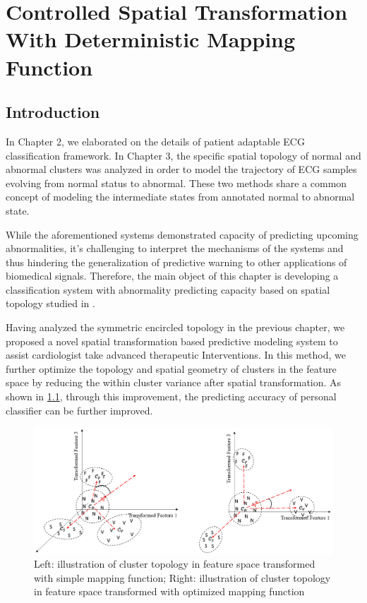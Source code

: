 \chapter{Controlled Spatial Transformation With Deterministic Mapping Function}
\section{Introduction}


 In Chapter 2, we elaborated on the details of patient adaptable ECG classification framework. In Chapter 3, the specific spatial topology of normal and abnormal clusters was analyzed in order to model the trajectory of ECG samples evolving from normal status to abnormal. These two methods share a common concept of modeling the intermediate states from annotated normal to abnormal state. 
 
 While the aforementioned systems demonstrated capacity of predicting upcoming abnormalities, it's challenging to interpret the mechanisms of the systems and thus hindering the generalization of predictive warning to other applications of biomedical signals. Therefore, the main object of this chapter is developing a classification system with abnormality predicting capacity based on spatial topology studied in \cite{chen2018predictive}. 
 
 Having analyzed the symmetric encircled topology in the previous chapter, we proposed a novel spatial transformation based predictive modeling system to assist cardiologist take advanced therapeutic Interventions. In this method, we further optimize the topology and spatial geometry of clusters in the feature space by reducing the within cluster variance after spatial transformation. As shown in \ref{fig:topo2}, through this improvement, the predicting accuracy of personal classifier can be further improved.
 
\begin{figure}[t]
\centering
\includegraphics[scale=.42]{Fig/topo2.png}
\caption{Left: illustration of cluster topology in feature space transformed with simple mapping function; Right: illustration of cluster topology in feature space transformed with optimized mapping function}
\label{fig:topo2}
\end{figure}

